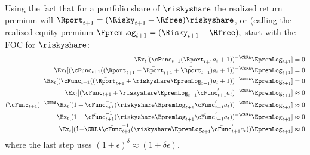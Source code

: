 \documentclass{\econtex}
\begin{document}
Using the fact that for a portfolio share of $\riskyshare$ the realized return premium will $\Rport_{t+1}=(\Risky_{t+1}-\Rfree)\riskyshare$, or (calling the realized equity premium $\EpremLog_{t+1}=(\Risky_{t+1}-\Rfree),$ start with the FOC for $\riskyshare$:
\begin{equation}\begin{gathered}\begin{aligned}
      \Ex_{t}[(\cFunc_{t+1}(\Rport_{t+1}{a}_{t}+1))^{-\CRRA}\EpremLog_{t+1}] & =  0 \label{eq:gameulernewnew}
      \\ \Ex_{t}[(\cFunc_{t+1}((\Rport_{t+1}-\ERport_{t+1}+\ERport_{t+1}){a}_{t}+1))^{-\CRRA}\EpremLog_{t+1}] & =  0
      \\ \Ex_{t}[(\cFunc_{t+1}((\ERport_{t+1}+\riskyshare\EpremLog_{t+1}){a}_{t}+1))^{-\CRRA}\EpremLog_{t+1}] & =  0
      \\ \Ex_{t}[(\cNxt+\riskyshare\EpremLog_{t+1}\bar{\cFunc}^{\prime}_{t+1}{a}_{t}\orderTwo )^{-\CRRA}\EpremLog_{t+1}] & \approx  0
      \\ (\cNxt)^{-\CRRA}
      \Ex_{t}[
      (1+
      \cNxt^{-1}(\riskyshare\EpremLog_{t+1}\bar{\cFunc}^{\prime}_{t+1}{a}_{t}\orderTwo)
      )^{-\CRRA}\EpremLog_{t+1}
      ]
      & \approx  0
      \\ \Ex_{t}[(1+\cNxt^{-1}(\riskyshare\EpremLog_{t+1}\bar{\cFunc}^{\prime}_{t+1}{a}_{t}\orderTwo))^{-\CRRA}\EpremLog_{t+1}]& \approx  0
      \\ 
      \Ex_{t}[
      (1{-\CRRA}
      \cNxt^{-1}(\riskyshare\EpremLog_{t+1}\bar{\cFunc}^{\prime}_{t+1}{a}_{t}\orderTwo)
      )\EpremLog_{t+1}
      ]
      & \approx  0
    \end{aligned}\end{gathered}\end{equation}
where the last step uses $(1+\epsilon)^{\delta} \approx (1+\delta \epsilon)$.
\end{document}
